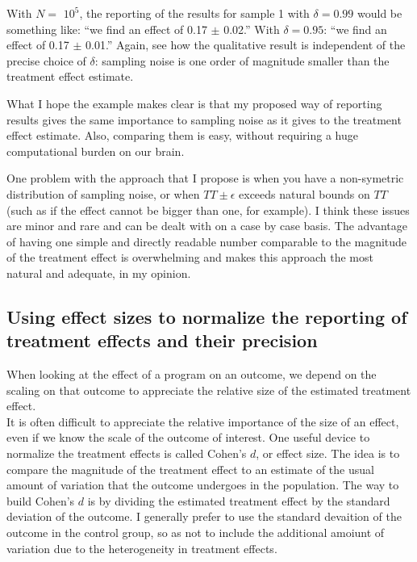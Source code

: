 \documentclass[]{book}
\theoremstyle{definition}
\theoremstyle{definition}
\theoremstyle{definition}
\theoremstyle{remark}
\let\BeginKnitrBlock\begin \let\EndKnitrBlock\end
\begin{document}
With \(N=\) \ensuremath{10^{5}}, the reporting of the results for sample 1 with \(\delta=0.99\) would be something like: ``we find an effect of 0.17 \(\pm\) 0.02.''
With \(\delta=0.95\): ``we find an effect of 0.17 \(\pm\) 0.01.''
Again, see how the qualitative result is independent of the precise choice of \(\delta\): sampling noise is one order of magnitude smaller than the treatment effect estimate.

\BeginKnitrBlock{remark}
\iffalse{} {Remark. } \fi{}What I hope the example makes clear is that my proposed way of reporting results gives the same importance to sampling noise as it gives to the treatment effect estimate.
Also, comparing them is easy, without requiring a huge computational burden on our brain.
\EndKnitrBlock{remark}

\BeginKnitrBlock{remark}
\iffalse{} {Remark. } \fi{}One problem with the approach that I propose is when you have a non-symetric distribution of sampling noise, or when \(TT \pm \epsilon\) exceeds natural bounds on \(TT\) (such as if the effect cannot be bigger than one, for example).
I think these issues are minor and rare and can be dealt with on a case by case basis.
The advantage of having one simple and directly readable number comparable to the magnitude of the treatment effect is overwhelming and makes this approach the most natural and adequate, in my opinion.
\EndKnitrBlock{remark}

\hypertarget{using-effect-sizes-to-normalize-the-reporting-of-treatment-effects-and-their-precision}{%
\subsection{Using effect sizes to normalize the reporting of treatment effects and their precision}\label{using-effect-sizes-to-normalize-the-reporting-of-treatment-effects-and-their-precision}}

When looking at the effect of a program on an outcome, we depend on the scaling on that outcome to appreciate the relative size of the estimated treatment effect.\\
It is often difficult to appreciate the relative importance of the size of an effect, even if we know the scale of the outcome of interest.
One useful device to normalize the treatment effects is called Cohen's \(d\), or effect size.
The idea is to compare the magnitude of the treatment effect to an estimate of the usual amount of variation that the outcome undergoes in the population.
The way to build Cohen's \(d\) is by dividing the estimated treatment effect by the standard deviation of the outcome.
I generally prefer to use the standard devaition of the outcome in the control group, so as not to include the additional amoiunt of variation due to the heterogeneity in treatment effects.
\end{document}
